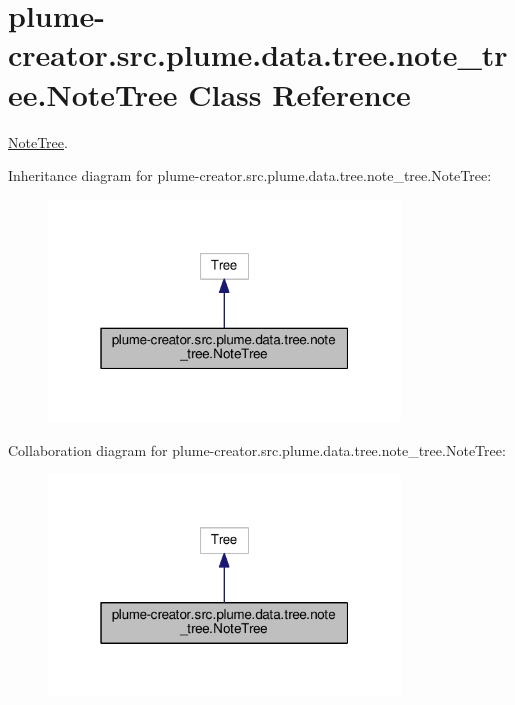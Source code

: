 \hypertarget{classplume-creator_1_1src_1_1plume_1_1data_1_1tree_1_1note__tree_1_1_note_tree}{}\section{plume-\/creator.src.\+plume.\+data.\+tree.\+note\+\_\+tree.\+Note\+Tree Class Reference}
\label{classplume-creator_1_1src_1_1plume_1_1data_1_1tree_1_1note__tree_1_1_note_tree}


\hyperlink{classplume-creator_1_1src_1_1plume_1_1data_1_1tree_1_1note__tree_1_1_note_tree}{Note\+Tree}.  




Inheritance diagram for plume-\/creator.src.\+plume.\+data.\+tree.\+note\+\_\+tree.\+Note\+Tree\+:\nopagebreak
\begin{figure}[H]
\begin{center}
\leavevmode
\includegraphics[width=265pt]{classplume-creator_1_1src_1_1plume_1_1data_1_1tree_1_1note__tree_1_1_note_tree__inherit__graph}
\end{center}
\end{figure}


Collaboration diagram for plume-\/creator.src.\+plume.\+data.\+tree.\+note\+\_\+tree.\+Note\+Tree\+:\nopagebreak
\begin{figure}[H]
\begin{center}
\leavevmode
\includegraphics[width=265pt]{classplume-creator_1_1src_1_1plume_1_1data_1_1tree_1_1note__tree_1_1_note_tree__coll__graph}
\end{center}
\end{figure}

